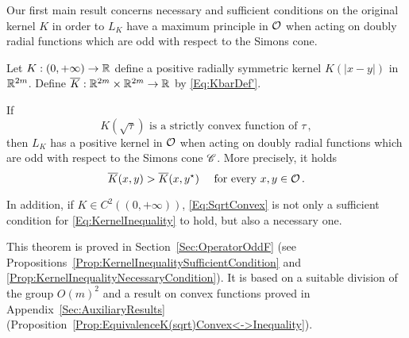 






Our first main result concerns necessary and sufficient conditions on the original kernel $K$ in order to $L_K$ have a maximum principle in $\mathcal{O}$ when acting on doubly radial functions which are odd with respect to the Simons cone. 

\begin{theorem}
	\label{Th:SufficientNecessaryConditions}
	Let $K:(0,+\infty) \to \mathbb{R}$ define a positive radially symmetric kernel $K(|x-y|)$ in $\mathbb{R}^{2m}$. Define $\overline{K} : \mathbb{R}^{2m}\times \mathbb{R}^{2m} \to \mathbb{R}$ by \eqref{Eq:KbarDef'}.
	
	If 
	\begin{equation}
		\label{Eq:SqrtConvex}	
		K(\sqrt{\tau}) \text{ is a strictly convex function of }\tau\,,
	\end{equation}
	then $L_K$ has a positive kernel in $\mathcal{O}$ when acting on doubly radial functions which are odd with respect to the Simons cone $\mathscr{C}$. More precisely, it holds
	\begin{equation}
	\label{Eq:KernelInequality}
	\overline{K}(x,y) > \overline{K}(x, y^\star) \quad \text{ for every }x,y \in \mathcal{O}\,.
	\end{equation}
	
	In addition, if $K\in C^2((0,+\infty))$, \eqref{Eq:SqrtConvex} is not only a sufficient condition for \eqref{Eq:KernelInequality} to hold, but also a necessary one.
\end{theorem}

This theorem is proved in Section~\ref{Sec:OperatorOddF} (see Propositions~\ref{Prop:KernelInequalitySufficientCondition} and \ref{Prop:KernelInequalityNecessaryCondition}). It is based on a suitable division of the group $O(m)^2$ and a result on convex functions proved in Appendix~\ref{Sec:AuxiliaryResults} (Proposition~\ref{Prop:EquivalenceK(sqrt)Convex<->Inequality}).

